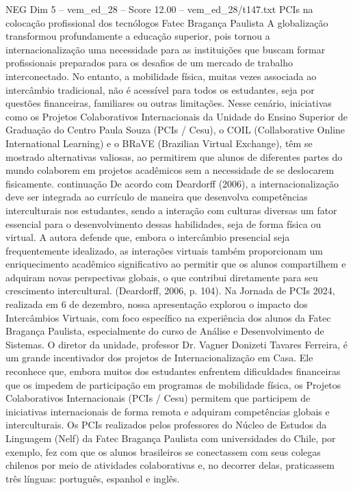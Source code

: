 \begin{textsample}{NEG Dim 5 – vem\_ed\_28 – Score 12.00 – vem\_ed\_28/t147.txt}  \label{ex:f5_neg_004}
PCIs na colocação profissional dos tecnólogos Fatec Bragança Paulista A globalização transformou profundamente a educação superior, pois tornou a internacionalização uma necessidade para as instituições que buscam formar profissionais preparados para os desafios de um mercado de trabalho interconectado.
No entanto, a mobilidade física, muitas vezes associada ao intercâmbio tradicional, não é acessível para todos os estudantes, seja por questões financeiras, familiares ou outras limitações.
Nesse cenário, iniciativas como os Projetos Colaborativos Internacionais da Unidade do Ensino Superior de Graduação do Centro Paula Souza (PCIs / Cesu), o COIL (Collaborative Online International Learning) e o BRaVE (Brazilian Virtual Exchange), têm se mostrado alternativas valiosas, ao permitirem que alunos de diferentes partes do mundo colaborem em projetos acadêmicos sem a necessidade de se deslocarem fisicamente. continuação De acordo com Deardorff (2006), a internacionalização deve ser integrada ao currículo de maneira que desenvolva competências interculturais nos estudantes, sendo a interação com culturas diversas um fator essencial para o desenvolvimento dessas habilidades, seja de forma física ou virtual.
A autora defende que, embora o intercâmbio presencial seja frequentemente idealizado, as interações virtuais também proporcionam um enriquecimento acadêmico significativo ao permitir que os alunos compartilhem e adquiram novas perspectivas globais, o que contribui diretamente para seu crescimento intercultural. (Deardorff, 2006, p. 104).
Na Jornada de PCIs 2024, realizada em 6 de dezembro, nossa apresentação explorou o impacto dos Intercâmbios Virtuais, com foco específico na experiência dos alunos da Fatec Bragança Paulista, especialmente do curso de Análise e Desenvolvimento de Sistemas.
O diretor da unidade, professor Dr.
Vagner Donizeti Tavares Ferreira, é um grande incentivador dos projetos de Internacionalização em Casa.
Ele reconhece que, embora muitos dos estudantes enfrentem dificuldades financeiras que os impedem de participação em programas de mobilidade física, os Projetos Colaborativos Internacionais (PCIs / Cesu) permitem que participem de iniciativas internacionais de forma remota e adquiram competências globais e interculturais.
Os PCIs realizados pelos professores do Núcleo de Estudos da Linguagem (Nelf) da Fatec Bragança Paulista com universidades do Chile, por exemplo, fez com que os alunos brasileiros se conectassem com seus colegas chilenos por meio de atividades colaborativas e, no decorrer delas, praticassem três línguas: português, espanhol e inglês.

\end{textsample}
